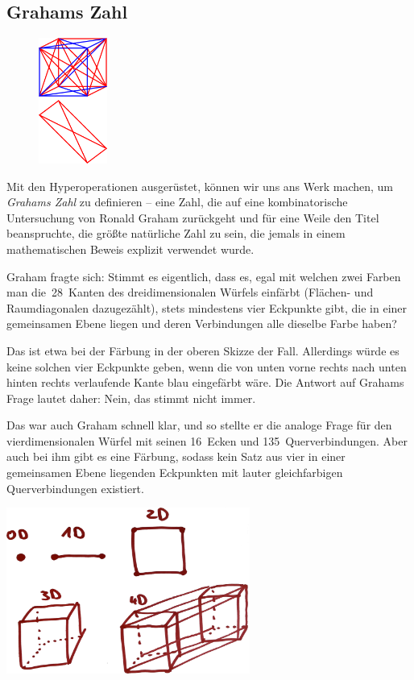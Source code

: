 \documentclass{../../zirkelblatt1718}
\theoremstyle{definition}
\theoremstyle{plain}
\theoremstyle{remark}
\begin{document}
\subsection{Grahams Zahl}

\begin{figure}
\vspace*{-1em}
\includegraphics[width=0.2\textwidth]{graham}
\end{figure}

Mit den Hyperoperationen ausgerüstet, können wir uns ans Werk machen, um
\emph{Grahams Zahl} zu definieren -- eine Zahl, die auf eine kombinatorische
Untersuchung von Ronald Graham zurückgeht und für eine Weile den Titel
beanspruchte, die größte natürliche Zahl zu sein, die jemals in einem
mathematischen Beweis explizit verwendet wurde.

Graham fragte sich: Stimmt es eigentlich, dass es, egal mit welchen zwei Farben
man die~28~Kanten des dreidimensionalen Würfels einfärbt (Flächen- und
Raumdiagonalen dazugezählt), stets mindestens vier Eckpunkte gibt, die in einer
gemeinsamen Ebene liegen und deren Verbindungen alle dieselbe Farbe haben?

Das ist etwa bei der Färbung in der oberen Skizze der Fall. Allerdings würde es
keine solchen vier Eckpunkte geben, wenn die von unten vorne rechts nach unten
hinten rechts verlaufende Kante blau eingefärbt wäre. Die Antwort auf Grahams
Frage lautet daher: Nein, das stimmt nicht immer.

Das war auch Graham schnell klar, und so stellte er die analoge Frage für den
vierdimensionalen Würfel mit seinen 16~Ecken und 135~Querverbindungen. Aber
auch bei ihm gibt es eine Färbung, sodass kein Satz aus vier in einer
gemeinsamen Ebene liegenden Eckpunkten mit lauter gleichfarbigen
Querverbindungen existiert.

\begin{center}
  \includegraphics[width=0.6\textwidth]{4d-tesseract}
\end{center}
\end{document}
